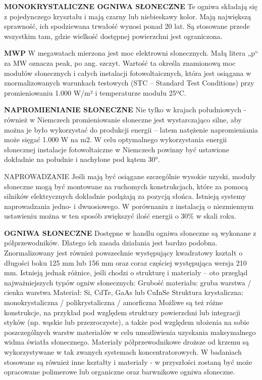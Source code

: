 \documentclass[12pt,a4paper]{article}
\begin{document}
\textbf{MONOKRYSTALICZNE OGNIWA SŁONECZNE}
Te ogniwa składają się z pojedynczego kryształu i mają czarny lub niebieskawy kolor. Mają największą sprawność, ich spodziewana trwałość wynosi ponad 20 lat. Są stosowane przede wszystkim tam, gdzie wielkość dostępnej powierzchni jest ograniczona.


\textbf{MWP}
W megawatach mierzona jest moc elektrowni słonecznych. Małą litera „p“ za MW oznacza peak, po ang. szczyt. Wartość ta określa znamionową moc modułów słonecznych i całych instalacji fotowoltaicznych, która jest osiągana w znormalizowanych warunkach testowych (STC – Standard Test Conditions) przy promieniowaniu 1.000 W/m² i temperaturze modułu 25ºC.


\textbf{NAPROMIENIANIE SŁONECZNE}
Nie tylko w krajach południowych - również w Niemczech promieniowanie słoneczne jest wystarczająco silne, aby można je było wykorzystać do produkcji energii – latem natężenie napromieniania może sięgać 1.000 W na m2. W celu optymalnego wykorzystania energii słonecznej instalacje fotowoltaiczne w Niemczech powinny być ustawione dokładnie na południe i nachylone pod kątem 30°.


NAPROWADZANIE 
Jeśli mają być osiągane szczególnie wysokie uzyski, moduły słoneczne mogą być montowane na ruchomych konstrukcjach, które za pomocą silników elektrycznych dokładnie podążają za pozycją słońca. Istnieją systemy naprowadzania jedno- i dwuosiowego. W porównaniu z instalacją o niezmiennym ustawieniu można w ten sposób zwiększyć ilość energii o 30\% w skali roku.


\textbf{OGNIWA SŁONECZNE} 
Dostępne w handlu ogniwa słoneczne są wykonane z półprzewodników. Dlatego ich zasada działania jest bardzo podobna. Znormalizowany jest również powszechnie występujący kwadratowy kształt o długości boku 125 mm lub 156 mm oraz coraz częściej występująca wersja 210 mm. Istnieją jednak różnice, jeśli chodzi o strukturę i materiały – oto przegląd najważniejszych typów ogniw słonecznych:
Grubość materiału:	gruba warstwa / cienka warstwa
Materiał:	Si, CdTe, GaAs lub CuInSe
Struktura krystaliczna:	monokrystaliczna / polikrystaliczna / amorficzna
Możliwe są też różne konstrukcje, na przykład pod względem struktury powierzchni lub integracji styków (np. wąskie lub przezroczyste), a także pod względem ułożenia na sobie poszczególnych warstw materiałów w celu umożliwienia uzyskania maksymalnego widma światła słonecznego.
Materiały półprzewodnikowe droższe od krzemu są wykorzystywane w tak zwanych systemach koncentratorowych. W badaniach stosowane są również inne kształty i materiały - w przyszłości zostaną być może opracowane polimerowe lub organiczne oraz barwnikowe ogniwa słoneczne.
\end{document}
